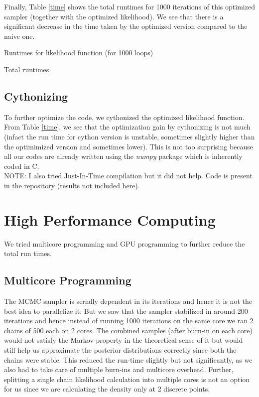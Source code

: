 \documentclass[11pt]{article}
\begin{document}
Finally, Table \ref{time} shows the total runtimes for 1000 iterations of this optimized sampler (together with the optimized likelihood). We see that there is a significant decrease in the time taken by the optimized version compared to the naive one.

\begin{table}[ht]
\centering
\caption{Runtimes for likelihood function (for 1000 loops) \label{time_like}}

\end{table}

\begin{table}[ht]
\centering
\caption{Total runtimes \label{time}}

\end{table}

\subsection{Cythonizing}
To further optimize the code, we cythonized the optimized likelihood function. From Table \ref{time}, we see that the optimization gain by cythonizing is not much (infact the run time for cython version is unstable, sometimes slightly higher than the optimimized version and sometimes lower). This is not too surprising because all our codes are already written using the \textit{numpy} package which is inherently coded in C.\\

NOTE: I also tried Just-In-Time compilation but it did not help. Code is present in the repository (results not included here).

\section{High Performance Computing}
We tried multicore programming and GPU programming to further reduce the total run times.

\subsection{Multicore Programming}
The MCMC sampler is serially dependent in its iterations and hence it is not the best idea to parallelize it. But we saw that the sampler stabilized in around 200 iterations and hence instead of running 1000 iterations on the same core we ran 2 chains of 500 each on 2 cores. The combined samples (after burn-in on each core) would not satisfy the Markov property in the theoretical sense of it but would still help us approximate the posterior distributions correctly since both the chains were stable. This reduced the run-time slightly but not significantly, as we also had to take care of multiple burn-ins and multicore overhead. Further, splitting a single chain likelihood calculation into multiple cores is not an option for us since we are calculating the density only at 2 discrete points. 
\end{document}
